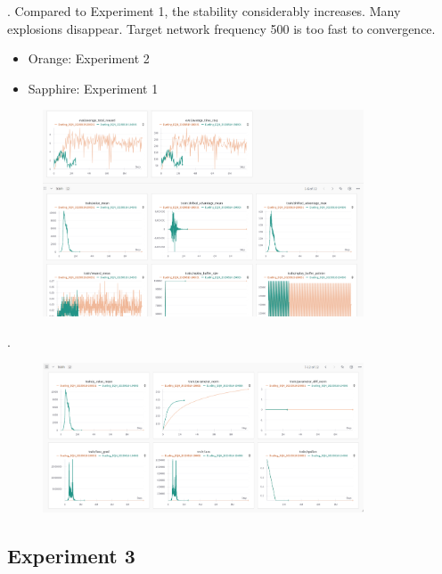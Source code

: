 \documentclass[8pt]{beamer}
\begin{document}
\begin{frame}{.}
    Compared to Experiment 1, the stability considerably increases.
    Many explosions disappear.
    Target network frequency 500 is too fast to convergence.

    \begin{itemize}
        \item Orange: Experiment 2
        \item Sapphire: Experiment 1
    \end{itemize}
    \begin{figure}
        \includegraphics[width=0.85\textwidth]{Exp2_1.png}
    \end{figure}
\end{frame}

\begin{frame}{.}
        \begin{figure}
        \includegraphics[width=0.85\textwidth]{Exp2_2.png}
    \end{figure}
\end{frame}

\subsection{Experiment 3}
\end{document}
